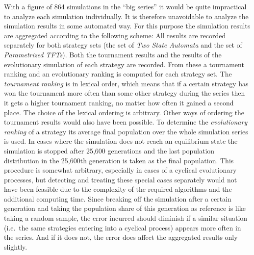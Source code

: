 With a figure of 864 simulations in the ``big series'' it would be quite
impractical to analyze each simulation individually. It is therefore
unavoidable to analyze the simulation results in some automated way. For this
purpose the simulation results are aggregated according to the following
scheme: All results are recorded separately for both strategy sets (the set of
{\em Two State Automata} and the set of {\em Parametrized TFTs}). Both the
tournament results and the results of the evolutionary simulation of each
strategy are recorded. From these a tournament ranking and an evolutionary
ranking is computed for each strategy set. The {\em tournament ranking} is in
lexical order, which means that if a certain strategy has won the tournament
more often than some other strategy during the series then it gets a higher
tournament ranking, no matter how often it gained a second place. The choice
of the lexical ordering is arbitrary. Other ways of ordering the tournament
results would also have been possible. To determine the {\em evolutionary
  ranking} of a strategy its average final population over the whole
simulation series is used. In cases where the simulation does not reach an
equilibrium state the simulation is stopped after 25,600 generations and the
last population distribution in the 25,600th generation is taken as the final
population. This procedure is somewhat arbitrary, especially in cases of a
cyclical evolutionary processes, but detecting and treating these special
cases separately would not have been feasible due to the complexity of the
required algorithms and the additional computing time. Since breaking off the
simulation after a certain generation and taking the population share of this
generation as reference is like taking a random sample, the error incurred
should diminish if a similar situation (i.e.\ the same strategies entering into
a cyclical process) appears more often in the series. And if it does not, the
error does affect the aggregated results only slightly.

